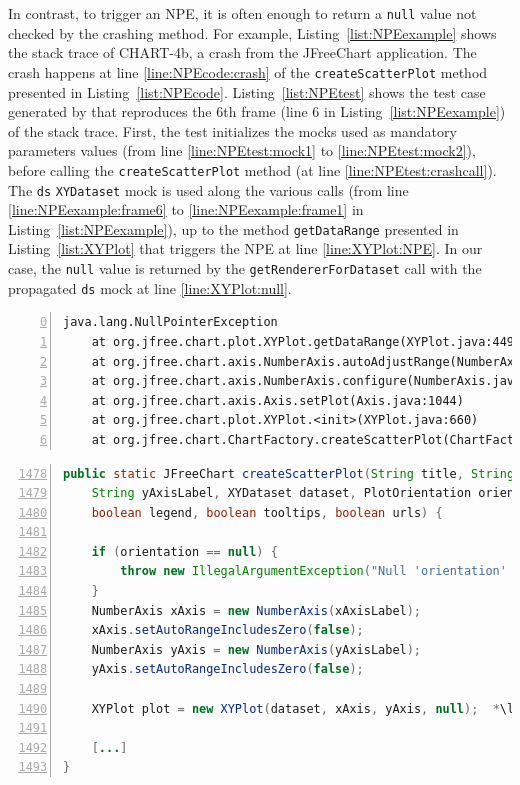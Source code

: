 In contrast, to trigger an NPE, it is often enough to return a \texttt{null} value not checked by the crashing method.
For example, Listing~\ref{list:NPEexample} shows the stack trace of CHART-4b, a crash from the JFreeChart application.
The crash happens at line \ref{line:NPEcode:crash} of the \texttt{createScatterPlot} method presented in Listing~\ref{list:NPEcode}. 
Listing~\ref{list:NPEtest} shows the test case generated by \evocrash that reproduces the 6th frame (line 6 in Listing~\ref{list:NPEexample}) of the stack trace. 
First, the test initializes the mocks used as mandatory parameters values (from line \ref{line:NPEtest:mock1} to \ref{line:NPEtest:mock2}), before calling the \texttt{createScatterPlot} method (at line \ref{line:NPEtest:crashcall}). The \texttt{ds} \texttt{XYDataset} mock is used along the various calls (from line \ref{line:NPEexample:frame6} to \ref{line:NPEexample:frame1} in Listing~\ref{list:NPEexample}), up to the method \texttt{getDataRange} presented in Listing~\ref{list:XYPlot} that triggers the NPE at line \ref{line:XYPlot:NPE}. In our case, the \texttt{null} value is returned by the \texttt{getRendererForDataset} call with the propagated \texttt{ds} mock at line \ref{line:XYPlot:null}.

\begin{lstlisting}[frame=tb,
  caption={Stack trace for the crash CHART-4b},
  label=list:NPEexample,
  captionpos=t,
  numbers=left,
  firstnumber=0]
java.lang.NullPointerException
	at org.jfree.chart.plot.XYPlot.getDataRange(XYPlot.java:4493)  *\label{line:NPEexample:frame1}*
	at org.jfree.chart.axis.NumberAxis.autoAdjustRange(NumberAxis.java:434)
	at org.jfree.chart.axis.NumberAxis.configure(NumberAxis.java:417)
	at org.jfree.chart.axis.Axis.setPlot(Axis.java:1044)
	at org.jfree.chart.plot.XYPlot.<init>(XYPlot.java:660)
	at org.jfree.chart.ChartFactory.createScatterPlot(ChartFactory.java:1490) *\label{line:NPEexample:frame6}*
\end{lstlisting}

\begin{lstlisting}[frame=tb,
  caption={Code excerpt from JFreeChart \texttt{ChartFactory.java}},
  label=list:NPEcode,
  captionpos=t,
  language=Java,
  numbers=left,
  firstnumber=1478]
public static JFreeChart createScatterPlot(String title, String xAxisLabel,
    String yAxisLabel, XYDataset dataset, PlotOrientation orientation,
    boolean legend, boolean tooltips, boolean urls) {

 	if (orientation == null) {
  		throw new IllegalArgumentException("Null 'orientation' argument.");
 	}
 	NumberAxis xAxis = new NumberAxis(xAxisLabel);
 	xAxis.setAutoRangeIncludesZero(false);
 	NumberAxis yAxis = new NumberAxis(yAxisLabel);
 	yAxis.setAutoRangeIncludesZero(false);

 	XYPlot plot = new XYPlot(dataset, xAxis, yAxis, null);  *\label{line:NPEcode:crash}*

 	[...]
}
\end{lstlisting}

